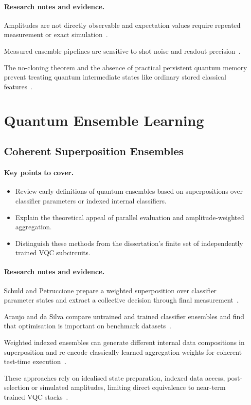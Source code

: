 \documentclass[]{UCD_CS_MSc_AAI_Report}
\newcommand{\challenge}[1]{{\color{red}#1}}
\newcommand{\limitation}[1]{{\color{orange}#1}}
\newcommand{\method}[1]{{\color{cyan!80!black}#1}}
\newcommand{\theory}[1]{{\color{gray}#1}}
\newcommand{\sectionbrief}{\paragraph{Key points to cover.}}
\newcommand{\researchnotes}{\paragraph{Research notes and evidence.}}
\begin{document}
\researchnotes
\begin{itemize}
    \theory{\item Amplitudes are not directly observable and expectation values require repeated measurement or exact simulation~\cite{resch_quantum_2019,tolotti_ensembles_2024}.}
    \challenge{\item Measured ensemble pipelines are sensitive to shot noise and readout precision~\cite{tolotti_ensembles_2024,tolotti_weighted_2025}.}
    \theory{\item The no-cloning theorem and the absence of practical persistent quantum memory prevent treating quantum intermediate states like ordinary stored classical features~\cite{resch_quantum_2019}.}
\end{itemize}

\section{Quantum Ensemble Learning}
\label{sec:rw-quantum-ensembles}

\subsection{Coherent Superposition Ensembles}

\sectionbrief
\begin{itemize}
    \item Review early definitions of quantum ensembles based on superpositions over classifier parameters or indexed internal classifiers.
    \item Explain the theoretical appeal of parallel evaluation and amplitude-weighted aggregation.
    \item Distinguish these methods from the dissertation's finite set of independently trained VQC subcircuits.
\end{itemize}

\researchnotes
\begin{itemize}
    \method{\item Schuld and Petruccione prepare a weighted superposition over classifier parameter states and extract a collective decision through final measurement~\cite{schuld_quantum_2018}.}
    \method{\item Araujo and da Silva compare untrained and trained classifier ensembles and find that optimisation is important on benchmark datasets~\cite{araujo_quantum_2020}.}
    \method{\item Weighted indexed ensembles can generate different internal data compositions in superposition and re-encode classically learned aggregation weights for coherent test-time execution~\cite{tolotti_weighted_2025}.}
    \limitation{\item These approaches rely on idealised state preparation, indexed data access, post-selection or simulated amplitudes, limiting direct equivalence to near-term trained VQC stacks~\cite{schuld_quantum_2018,araujo_quantum_2020,tolotti_weighted_2025}.}
\end{itemize}
\end{document}
